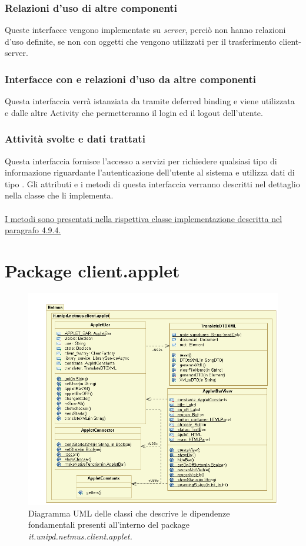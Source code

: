 \subsubsection*{Relazioni d'uso di altre componenti}
Queste interfacce vengono implementate su \emph{server}, perci\`o non
hanno relazioni d'uso definite, se non con oggetti  che
vengono utilizzati per il trasferimento client-server.
\subsubsection*{Interfacce con e relazioni d'uso da altre componenti}
Questa interfaccia verr\`a istanziata da  tramite deferred
binding e viene utilizzata \\ e dalle altre Activity che
permetteranno il login ed il logout dell'utente.
\subsubsection*{Attivit\`a svolte e dati trattati}
Questa interfaccia fornisce l'accesso a servizi per richiedere qualsiasi tipo
di informazione riguardante l'autenticazione dell'utente al sistema
e utilizza dati di tipo .
Gli attributi e i metodi di questa interfaccia verranno descritti nel
dettaglio nella classe  che li implementa. \\\\
\underline{I metodi sono presentati nella rispettiva classe implementazione
descritta nel paragrafo 4.9.4.}


\newpage
\section{Package client.applet} %

\begin{figure}[h]
  \centering
  \includegraphics[width=13cm]{img/DP/netmus_client_applet.png}
\caption{Diagramma UML delle classi che descrive le dipendenze
fondamentali presenti all'interno del package
\emph{it.unipd.netmus.client.applet.}}
\end{figure}


